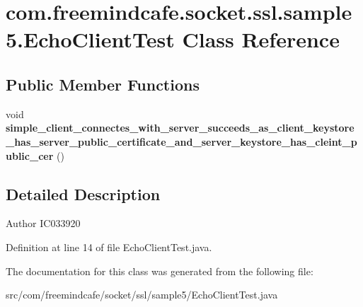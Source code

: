 \hypertarget{classcom_1_1freemindcafe_1_1socket_1_1ssl_1_1sample5_1_1_echo_client_test}{}\section{com.\+freemindcafe.\+socket.\+ssl.\+sample5.\+Echo\+Client\+Test Class Reference}
\label{classcom_1_1freemindcafe_1_1socket_1_1ssl_1_1sample5_1_1_echo_client_test}
\subsection*{Public Member Functions}
\begin{DoxyCompactItemize}
\item 
\hypertarget{classcom_1_1freemindcafe_1_1socket_1_1ssl_1_1sample5_1_1_echo_client_test_a9e99c701c1edc6b79033263fe0b3f8fc}{}void {\bfseries simple\+\_\+client\+\_\+connectes\+\_\+with\+\_\+server\+\_\+succeeds\+\_\+as\+\_\+client\+\_\+keystore\+\_\+has\+\_\+server\+\_\+public\+\_\+certificate\+\_\+and\+\_\+server\+\_\+keystore\+\_\+has\+\_\+cleint\+\_\+public\+\_\+cer} ()\label{classcom_1_1freemindcafe_1_1socket_1_1ssl_1_1sample5_1_1_echo_client_test_a9e99c701c1edc6b79033263fe0b3f8fc}

\end{DoxyCompactItemize}


\subsection{Detailed Description}
\begin{DoxyAuthor}{Author}
I\+C033920 
\end{DoxyAuthor}


Definition at line 14 of file Echo\+Client\+Test.\+java.



The documentation for this class was generated from the following file\+:\begin{DoxyCompactItemize}
\item 
src/com/freemindcafe/socket/ssl/sample5/Echo\+Client\+Test.\+java\end{DoxyCompactItemize}
